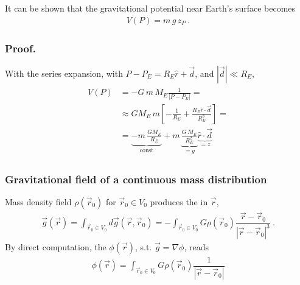 \documentclass[letterpaper,10pt,english]{jupyterBook}
\begin{document}
\sphinxAtStartPar
{} It can be shown that the gravitational potential near Earth’s surface becomes
\begin{equation*}
\begin{split}V(P) = m \, g \, z_P \ .\end{split}
\end{equation*}\subsubsection*{Proof.}

\sphinxAtStartPar
With the series expansion, with \(P - P_E = R_E \hat{r} + \vec{d}\), and \(|\vec{d}| \ll R_E\),
\begin{equation*}
\begin{split}\begin{aligned}
  V(P) & = - G \, m \, M_E \frac{1}{|P - P_E|} = \\
       & \approx G M_E \, m \left[ - \frac{1}{R_E} + \frac{R_E \hat{r} \cdot \vec{d}}{R_E^3}  \right]   = \\
       & = \underbrace{- m \, \frac{ G M_E}{R_E}}_{\text{const}} + m \, \underbrace{\frac{G \, M_E}{R_E^2}}_{= g} \underbrace{\hat{r} \cdot \vec{d}}_{= z}
\end{aligned}\end{split}
\end{equation*}

\subsubsection{Gravitational field of a continuous mass distribution}
\label{\detokenize{ch/actions-examples:gravitational-field-of-a-continuous-mass-distribution}}
\sphinxAtStartPar
Mass density field \(\rho(\vec{r}_0)\) for \(\vec{r}_0 \in V_0\) produces the  in \(\vec{r}\),
\begin{equation*}
\begin{split}\vec{g}(\vec{r}) = \int_{\vec{r}_0 \in V_0} d \vec{g}(\vec{r}, \vec{r}_0) = - \int_{\vec{r}_0 \in V_0} G \rho(\vec{r}_0) \dfrac{\vec{r} - \vec{r}_0}{\left|\vec{r} - \vec{r}_0\right|^3} \ .\end{split}
\end{equation*}
\sphinxAtStartPar
By direct computation, the  \(\phi(\vec{r})\), s.t. \(\vec{g} = \nabla \phi\), reads
\begin{equation*}
\begin{split}\phi(\vec{r}) = \int_{\vec{r}_0 \in V_0} G \rho(\vec{r}_0) \dfrac{1}{|\vec{r}-\vec{r}_0|}\end{split}
\end{equation*}
\end{document}
